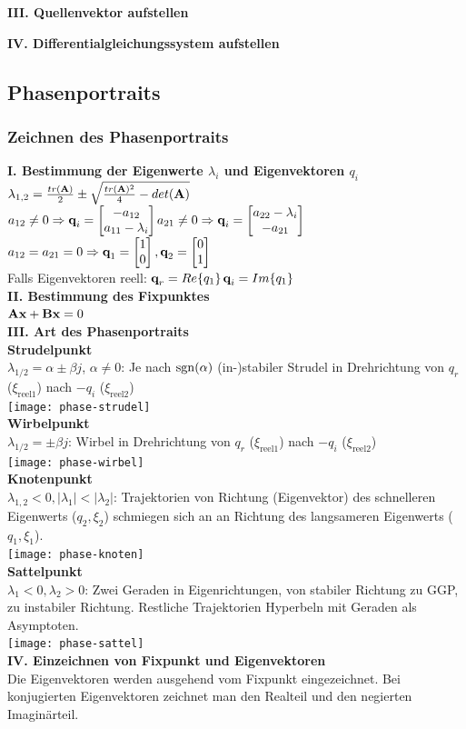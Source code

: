 \documentclass[fs, footer]{latex4ei}
\begin{document}
\begin{multicols*}{4}
		\textbf{III. Quellenvektor aufstellen}

		\textbf{IV. Differentialgleichungssystem aufstellen}
	\subsection{Phasenportraits}
	\subsubsection{Zeichnen des Phasenportraits}
		\textbf{I. Bestimmung der Eigenwerte $\lambda_i$ und Eigenvektoren $q_i$}\\
		$\lambda_{1,2} = \frac{tr(\textbf{A})}{2} \pm \sqrt{\frac{tr(\textbf{A})^2}{4}-det(\textbf{A})}$\\
		$a_{12} \neq 0 \Rightarrow \textbf{q}_i = \begin{bmatrix} -a_{12}\\a_{11}-\lambda_i \end{bmatrix}$\quad $a_{21} \neq 0 \Rightarrow \textbf{q}_i = \begin{bmatrix} a_{22}-\lambda_i\\-a_{21} \end{bmatrix}$\quad$a_{12} = a_{21} = 0 \Rightarrow \textbf{q}_1 = \begin{bmatrix} 1\\0 \end{bmatrix}, \textbf{q}_2 = \begin{bmatrix} 0\\1 \end{bmatrix}$\\
		Falls Eigenvektoren reell: $\textbf{q}_r = Re\{q_1\}$\qquad$\textbf{q}_i = Im\{q_1\}$\\
		\textbf{II. Bestimmung des Fixpunktes}\\
		$\textbf{A}\textbf{x} + \textbf{B}\textbf{x} = 0$\\
		\textbf{III. Art des Phasenportraits}\\
		\textbf{Strudelpunkt}\\
		$\lambda_{1/2} = \alpha \pm \beta j$, $\alpha \neq 0$: Je nach $\operatorname{sgn}(\alpha)$ (in-)stabiler Strudel in Drehrichtung von $q_r$ ($\xi_{\text{reel}1}$) nach $-q_i$ ($\xi_{\text{reel}2}$)\\
		\texttt{[image: phase-strudel]}\\
		\textbf{Wirbelpunkt}\\
		$\lambda_{1/2} = \pm \beta j$: Wirbel in Drehrichtung von $q_r$ ($\xi_{\text{reel}1}$) nach $-q_i$ ($\xi_{\text{reel}2}$)\\
		\texttt{[image: phase-wirbel]}\\
		\textbf{Knotenpunkt}\\
		$\lambda_{1,2} < 0, |\lambda_1| < |\lambda_2|$: Trajektorien von Richtung (Eigenvektor) des schnelleren Eigenwerts ($q_2, \xi_2$) schmiegen sich an an Richtung des langsameren Eigenwerts ($q_1, \xi_1$).\\
		\texttt{[image: phase-knoten]}\\
		\textbf{Sattelpunkt}\\
		$\lambda_1 < 0, \lambda_2 > 0$: Zwei Geraden in Eigenrichtungen, von stabiler Richtung zu GGP, zu instabiler Richtung. Restliche Trajektorien Hyperbeln mit Geraden als Asymptoten.\\
		\texttt{[image: phase-sattel]}\\
		\textbf{IV. Einzeichnen von Fixpunkt und Eigenvektoren}\\
		Die Eigenvektoren werden ausgehend vom Fixpunkt eingezeichnet. Bei konjugierten Eigenvektoren zeichnet man den Realteil und den negierten Imaginärteil.\\

\end{multicols*}
\end{document}
